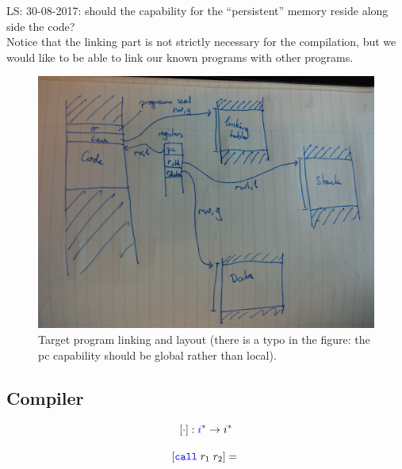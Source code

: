 \documentclass[a4paper]{article}
\newcommand\lau[1]{{\color{purple} \sf \footnotesize {LS: #1}}\\}
\newcommand{\fun}{\rightarrow}
\newcommand{\sourcecolor}[1]{\color{blue}}
\newcommand{\src}[1]{{\sourcecolor{} #1}}
\newcommand{\targetcolor}[1]{\color{black}}
\newcommand{\trg}[1]{{\targetcolor{} #1}}
\newcommand{\zinstr}[1]{\texttt{#1}}
\newcommand{\twoinstr}[3]{
  \ifthenelse{\equal{#2#3}{}}
  {\zinstr{#1}}
  {\zinstr{#1} \; #2 \; #3}
}
\newcommand{\scall}[2]{\twoinstr{\src{call}}{#1}{#2}}
\newcommand{\comp}[1]{[#1]}
\begin{document}
\lau{30-08-2017: should the capability for the ``persistent'' memory reside along side the code?}

Notice that the linking part is not strictly necessary for the compilation, but we would like to be able to link our known programs with other programs.

\begin{figure}
  \centering
  \includegraphics[width=\textwidth]{img/prog_layout.jpg}
  \caption{Target program linking and layout (there is a typo in the figure: the pc capability should be global rather than local).}
  \label{fig:trg-prog-link}
\end{figure}

\subsection{Compiler}
\[
\comp{\cdot} : \src{i}^* \fun \trg{i}^*
\]

\[
  \comp{\scall{r_1}{r_2}} = 
  \begin{array}[t]{l}
  \end{array}
\]
\end{document}
